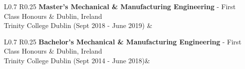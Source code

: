 \documentclass[a4paper,11pt]{article}
\newlength{\itemwidth}
\begin{document}
\begin{tabularx}%
{\linewidth}{ L{0.7\linewidth} R{0.25\linewidth}}
    \textbf{Master's Mechanical \& Manufacturing Engineering} - First Class Honours & Dublin, Ireland\\
    Trinity College Dublin (Sept 2018 - June 2019) &
    \\
    [2pt]
\end{tabularx}

\begin{tabularx}%
{\linewidth}{ L{0.7\linewidth} R{0.25\linewidth}}
    \textbf{Bachelor's Mechanical \& Manufacturing Engineering} - First Class Honours & Dublin, Ireland\\
    Trinity College Dublin (Sept 2014 - June 2018)&
     \\[2pt]
\end{tabularx}
\end{document}
